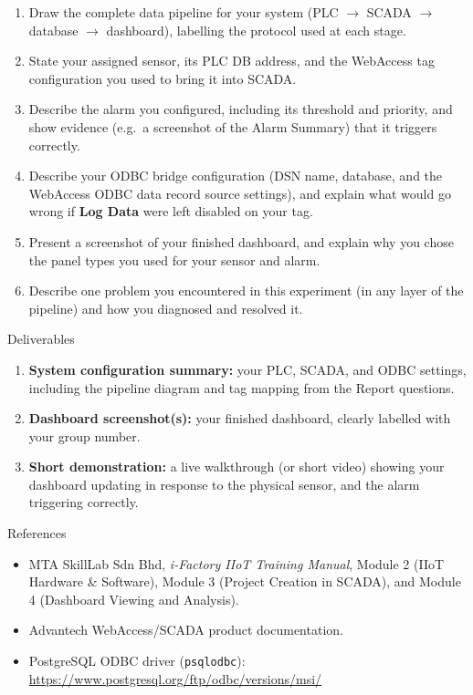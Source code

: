 \begin{reportq}
  \begin{enumerate}
    \item Draw the complete data pipeline for your system (PLC $\to$ SCADA $\to$ database $\to$ dashboard), labelling the protocol used at each stage.
    \item State your assigned sensor, its PLC DB address, and the WebAccess tag configuration you used to bring it into SCADA.
    \item Describe the alarm you configured, including its threshold and priority, and show evidence (e.g.\ a screenshot of the Alarm Summary) that it triggers correctly.
    \item Describe your ODBC bridge configuration (DSN name, database, and the WebAccess ODBC data record source settings), and explain what would go wrong if \textbf{Log Data} were left disabled on your tag.
    \item Present a screenshot of your finished dashboard, and explain why you chose the panel types you used for your sensor and alarm.
    \item Describe one problem you encountered in this experiment (in any layer of the pipeline) and how you diagnosed and resolved it.
  \end{enumerate}
\end{reportq}

\begin{labsection}{Deliverables}{}
  \begin{enumerate}
    \item \textbf{System configuration summary:} your PLC, SCADA, and ODBC settings, including the pipeline diagram and tag mapping from the Report questions.
    \item \textbf{Dashboard screenshot(s):} your finished dashboard, clearly labelled with your group number.
    \item \textbf{Short demonstration:} a live walkthrough (or short video) showing your dashboard updating in response to the physical sensor, and the alarm triggering correctly.
  \end{enumerate}
\end{labsection}

\begin{labsection}{References}{}
  \begin{itemize}
    \item MTA SkillLab Sdn Bhd, \textit{i-Factory IIoT Training Manual}, Module 2 (IIoT Hardware \& Software), Module 3 (Project Creation in SCADA), and Module 4 (Dashboard Viewing and Analysis).
    \item Advantech WebAccess/SCADA product documentation.
    \item PostgreSQL ODBC driver (\texttt{psqlodbc}): \url{https://www.postgresql.org/ftp/odbc/versions/msi/}
  \end{itemize}
\end{labsection}

